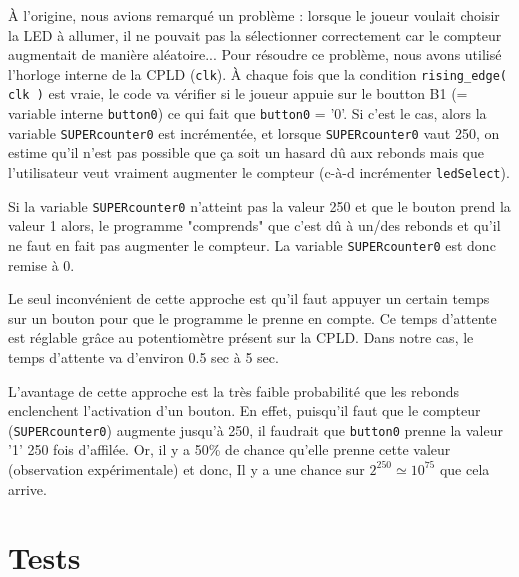\documentclass{article}
\begin{document}
À l'origine, nous avions remarqué un problème : lorsque le joueur voulait choisir la LED à allumer, il ne pouvait pas la sélectionner correctement car le compteur augmentait de manière aléatoire... Pour résoudre ce problème, nous avons utilisé l'horloge interne de la CPLD (\texttt{clk}). À chaque fois que la condition \texttt{rising\_edge( clk )} est vraie, le code va vérifier si le joueur appuie sur le boutton B1 (= variable interne \texttt{button0}) ce qui fait que \texttt{button0} = '0'. Si c'est le cas, alors la variable \texttt{SUPERcounter0} est incrémentée, et lorsque \texttt{SUPERcounter0} vaut 250, on estime qu'il n'est pas possible que ça soit un hasard dû aux rebonds mais que l'utilisateur veut vraiment augmenter le compteur (c-à-d incrémenter \texttt{ledSelect}).

Si la variable \texttt{SUPERcounter0} n'atteint pas la valeur 250 et que le bouton prend la valeur 1 alors, le programme "comprends" que c'est dû à un/des rebonds et qu'il ne faut en fait pas augmenter le compteur. La variable \texttt{SUPERcounter0} est donc remise à 0.

Le seul inconvénient de cette approche est qu'il faut appuyer un certain temps sur un bouton pour que le programme le prenne en compte. Ce temps d'attente est réglable grâce au potentiomètre présent sur la CPLD. Dans notre cas, le temps d'attente va d'environ 0.5 sec à 5 sec.

L'avantage de cette approche est la très faible probabilité que les rebonds enclenchent l'activation d'un bouton. En effet, puisqu'il faut que le compteur (\texttt{SUPERcounter0}) augmente jusqu'à 250, il faudrait que \texttt{button0} prenne la valeur '1' 250 fois d'affilée. Or, il y a 50\% de chance qu'elle prenne cette valeur (observation expérimentale) et donc, Il y a une chance sur $ 2^{250} \simeq 10^{75} $ que cela arrive.










\newpage










\section{Tests}
\end{document}
